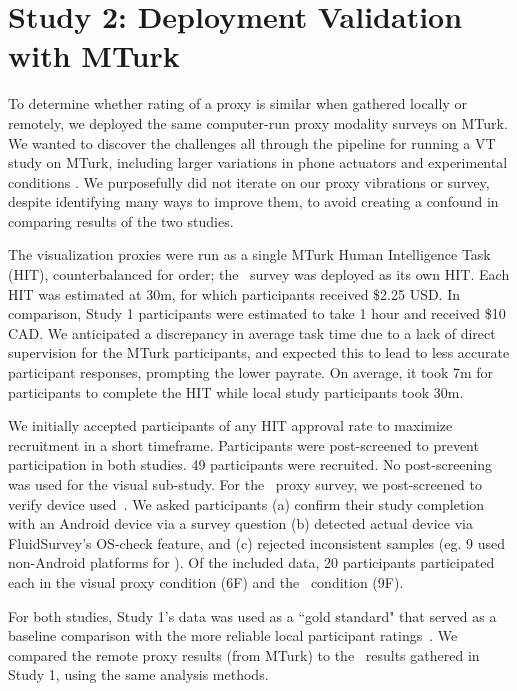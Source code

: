 \section{Study 2: Deployment Validation with MTurk }
To determine whether rating of a proxy is similar when gathered locally or remotely, we deployed the same computer-run proxy modality surveys on MTurk.
We wanted to discover the challenges all through the pipeline for running a VT study on MTurk, including larger variations in phone actuators and experimental conditions . 
We purposefully did not iterate on our proxy vibrations or survey, despite identifying many ways to improve them, to avoid creating a confound in comparing results of the two studies. 

The visualization proxies were run as a single MTurk Human Intelligence Task (HIT), counterbalanced for order; the \lofi\ survey was deployed as its own HIT.
Each HIT was estimated at 30m, for which participants received \$2.25 USD. In comparison, Study 1 participants were estimated to take 1 hour and received \$10 CAD. 
We anticipated a discrepancy in average task time due to a lack of direct supervision for the MTurk participants, and expected this to lead to less accurate participant responses, prompting the lower payrate.
On average, it took 7m for participants to complete the HIT while local study participants took 30m.

We initially accepted participants of any HIT approval rate to maximize recruitment in a short timeframe. Participants were post-screened to prevent participation in both studies. 49 participants were recruited. 
%
No post-screening was used for the visual sub-study.
For the \lofi~proxy survey, we post-screened
to verify device used~\cite{behavioralturk}. 
We asked participants (a) confirm their study completion with an Android device via a survey question (b) detected actual device via FluidSurvey's OS-check feature, and (c) rejected inconsistent samples (eg. 9 used non-Android platforms for \lofi). 
Of the included data, 20 participants participated each in the visual proxy condition (6F) and the \lofi~condition (9F).

For both studies, Study 1's data was used as a ``gold standard" that served as a baseline comparison with the more reliable local participant ratings~\cite{Amazon.comInc.2015}.
%
We compared the remote proxy results (from MTurk) to the \hifi~results gathered in Study 1, using the same analysis methods.

